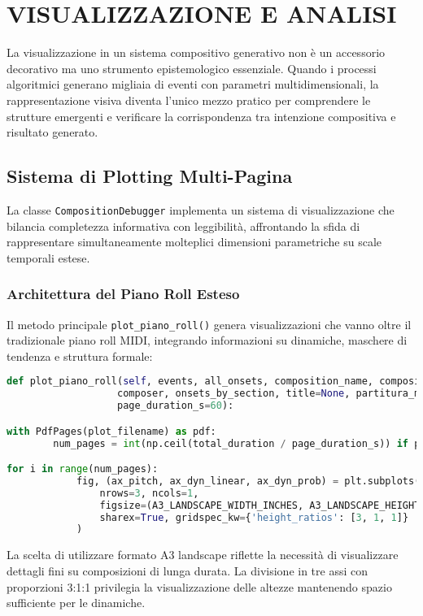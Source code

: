 
\section{VISUALIZZAZIONE E ANALISI}
La visualizzazione in un sistema compositivo generativo non è un accessorio decorativo ma uno strumento epistemologico essenziale. Quando i processi algoritmici generano migliaia di eventi con parametri multidimensionali, la rappresentazione visiva diventa l'unico mezzo pratico per comprendere le strutture emergenti e verificare la corrispondenza tra intenzione compositiva e risultato generato.
\subsection{Sistema di Plotting Multi-Pagina}
La classe \texttt{CompositionDebugger} implementa un sistema di visualizzazione che bilancia completezza informativa con leggibilità, affrontando la sfida di rappresentare simultaneamente molteplici dimensioni parametriche su scale temporali estese.
\subsubsection{Architettura del Piano Roll Esteso}
Il metodo principale \texttt{plot\_piano\_roll()} genera visualizzazioni che vanno oltre il tradizionale piano roll MIDI, integrando informazioni su dinamiche, maschere di tendenza e struttura formale:

\begin{lstlisting}[language=Python]
def plot_piano_roll(self, events, all_onsets, composition_name, composition_structure, 
                   composer, onsets_by_section, title=None, partitura_mode=False, 
                   page_duration_s=60):

with PdfPages(plot_filename) as pdf:
        num_pages = int(np.ceil(total_duration / page_duration_s)) if partitura_mode else 1

for i in range(num_pages):
            fig, (ax_pitch, ax_dyn_linear, ax_dyn_prob) = plt.subplots(
                nrows=3, ncols=1, 
                figsize=(A3_LANDSCAPE_WIDTH_INCHES, A3_LANDSCAPE_HEIGHT_INCHES),
                sharex=True, gridspec_kw={'height_ratios': [3, 1, 1]}
            )
\end{lstlisting}

La scelta di utilizzare formato A3 landscape riflette la necessità di visualizzare dettagli fini su composizioni di lunga durata. La divisione in tre assi con proporzioni 3:1:1 privilegia la visualizzazione delle altezze mantenendo spazio sufficiente per le dinamiche.
